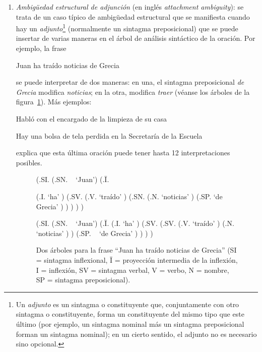 \begin{enumerate}
\item \emph{Ambigüedad estructural de adjunción} (en inglés \emph{attachment ambiguity}): se trata de un caso típico de ambigüedad estructural que se manifiesta cuando hay un {\em adjunto}\footnote{Un \emph{adjunto} es un sintagma o constituyente que, conjuntamente con otro sintagma o constituyente, forma un constituyente del mismo tipo que este último (por ejemplo, un sintagma nominal más un sintagma preposicional forman un sintagma nominal); en un cierto sentido, el adjunto no es necesario sino opcional.} (normalmente un sintagma preposicional) que se puede insertar de varias maneras en el árbol de análisis sintáctico de la oración. Por ejemplo, la frase \begin{exemple} Juan ha traído noticias de Grecia \end{exemple} se puede interpretar de dos maneras: en una, el sintagma preposicional \emph{de Grecia} modifica \emph{noticias}; en la otra, modifica \emph{traer} (véanse los árboles de la figura~\ref{fg:noticies}). Más ejemplos: \begin{exemple} Habló con el encargado de la limpieza de su casa \end{exemple} \begin{exemple} Hay una bolsa de tela perdida en la Secretaría de la Escuela \label{ex:bossa} \end{exemple} \citet{tuson99b} explica que esta última oración puede tener hasta 12 interpretaciones posibles. 

\begin{figure} \begin{center} \begin{parsetree} (.SI. (.SN. ~ `Juan') (.{\={I}}. 

(.I. `ha' ) (.SV. (.V. `traído' ) (.SN. (.N. `noticias' ) (.SP. `de Grecia' ) ) ) ) ) \end{parsetree} \end{center} \begin{center} \begin{parsetree} (.SI. (.SN. ~ `Juan') (.{\={I}}. (.I. `ha' ) (.SV. (.SV. (.V. `traído' ) (.N. `noticias' ) ) (.SP. ~ `de Grecia' ) ) ) ) \end{parsetree} \end{center} \caption{Dos árboles para la frase ``Juan ha traído noticias de Grecia'' (SI = sintagma inflexional, \={I =} proyección intermedia de la inflexión, I = inflexión, SV = sintagma verbal, V = verbo, N = nombre, SP = sintagma preposicional). } \label{fg:noticies} \end{figure} \end{enumerate} 

